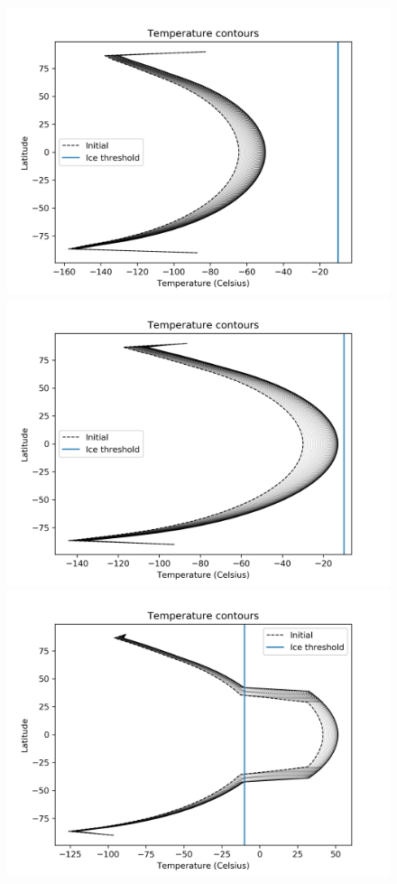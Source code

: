 \documentclass{article}
\begin{document}
\begin{figure}
\includegraphics[scale=0.4]{tcont_58.png} 
\includegraphics[scale=0.4]{tcont_510.png} 
\includegraphics[scale=0.4]{tcont_512.png} 

\end{figure}
\end{document}
